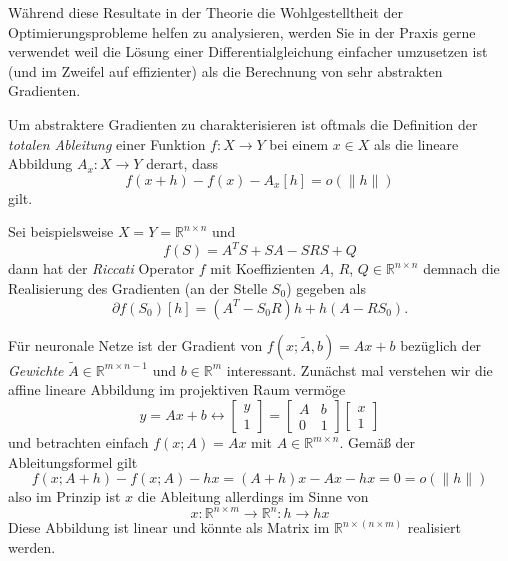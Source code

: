 \documentclass[
]{book}
\theoremstyle{definition}
\theoremstyle{definition}
\theoremstyle{definition}
\theoremstyle{definition}
\theoremstyle{remark}
\begin{document}
Während diese Resultate in der Theorie die Wohlgestelltheit der
Optimierungsprobleme helfen zu analysieren, werden Sie in der Praxis gerne
verwendet weil die Lösung einer Differentialgleichung einfacher umzusetzen
ist (und im Zweifel auf effizienter) als die Berechnung von sehr abstrakten
Gradienten.

Um abstraktere Gradienten zu charakterisieren ist oftmals die Definition der
\emph{totalen Ableitung} einer Funktion \(f\colon X\to Y\) bei einem \(x\in X\) als die lineare Abbildung \(A_x\colon X\to Y\) derart, dass
\begin{equation*}
f(x+h) - f(x) - A_x[h] = o(\| h\|)
\end{equation*}
gilt.

Sei beispielsweise \(X=Y=\mathbb R^{n\times n}\) und
\begin{equation*}
f(S) = A^TS + SA -SRS + Q
\end{equation*}
dann hat der \emph{Riccati} Operator \(f\) mit Koeffizienten \(A\), \(R\), \(Q \in \mathbb R^{n\times n}\)
demnach die Realisierung des Gradienten (an der Stelle \(S_0\)) gegeben als
\begin{equation*}
\partial f(S_0)[h] = (A^T-S_0R)h + h(A-RS_0).
\end{equation*}

Für neuronale Netze ist der Gradient von \(f(x; \tilde A, b)=Ax+b\) bezüglich der
\emph{Gewichte} \(\tilde A\in \mathbb R^{m\times n-1}\) und \(b\in \mathbb R^{m}\) interessant.
Zunächst mal verstehen wir die affine lineare Abbildung im
projektiven Raum vermöge
\begin{equation*}
y = Ax + b \longleftrightarrow \begin{bmatrix} y \\ 1 \end{bmatrix} = \begin{bmatrix}A & b \\ 0 & 1 \end{bmatrix}\begin{bmatrix} x \\ 1
\end{bmatrix}
\end{equation*}
und betrachten einfach \(f(x; A)=Ax\) mit \(A\in \mathbb R^{m\times n}\). Gemäß der Ableitungsformel gilt
\begin{equation*}
f(x;A+h) - f(x;A) - hx = (A+h)x - Ax - hx = 0 = o(\|h\|)
\end{equation*}
also im Prinzip ist \(x\) die Ableitung allerdings im Sinne von
\begin{equation*}
x\colon \mathbb R^{n\times m} \to \mathbb R^{n}\colon h\to hx
\end{equation*}
Diese Abbildung ist linear und könnte als Matrix
im \(\mathbb R^{n \times (n\times m)}\) realisiert werden.
\end{document}
